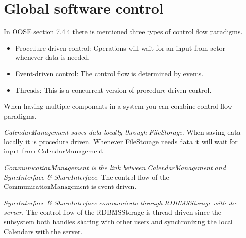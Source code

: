 \section{Global software control}

In OOSE section 7.4.4 there is mentioned three types of control flow paradigms. 

\begin{itemize}
	\item Procedure-driven control: Operations will wait for an input from actor whenever data is needed. 
	\item Event-driven control: The control flow is determined by events.
	\item Threads: This is a concurrent version of procedure-driven control.
\end{itemize}

 When having multiple components in a system you can combine control flow paradigms.
 
 \emph{CalendarManagement saves data locally through FileStorage.} When saving data locally it is procedure driven. Whenever FileStorage needs data it will wait for input from CalendarManagement.
 
 \emph{CommunicationManagement is the link between CalendarManagement and SyncInterface \& ShareInterface.} The control flow of the CommunicationManagement is event-driven.
 
 \emph{SyncInterface \& ShareInterface communicate through RDBMSStorage with the server.} The control flow of the RDBMSStorage is thread-driven since the subsystem both handles sharing with other users and synchronizing the local Calendars with the server. 